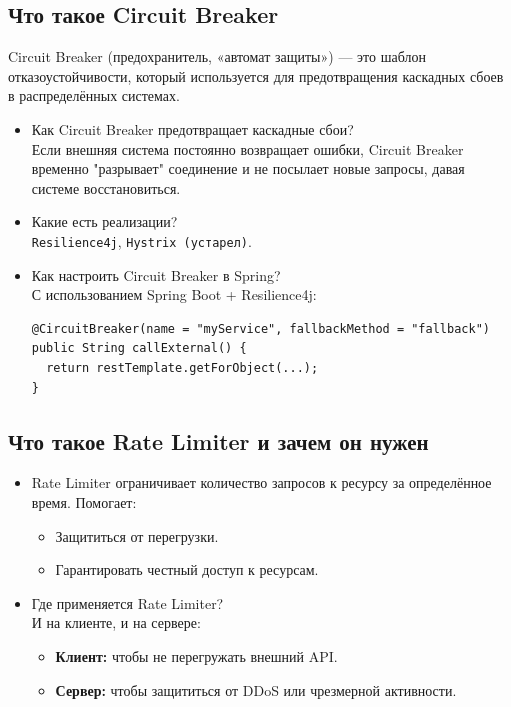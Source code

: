 \documentclass[a4paper,14pt]{article}
\begin{document}
\subsection{Что такое Circuit Breaker}
Circuit Breaker (предохранитель, «автомат защиты») — это шаблон отказоустойчивости, который используется для предотвращения каскадных сбоев в распределённых системах.
\begin{itemize}
\item Как Circuit Breaker предотвращает каскадные сбои? \\
Если внешняя система постоянно возвращает ошибки, Circuit Breaker временно "разрывает" соединение и не посылает новые запросы, давая системе восстановиться.

\item Какие есть реализации? \\
\texttt{Resilience4j}, \texttt{Hystrix (устарел)}.

\item Как настроить Circuit Breaker в Spring? \\
С использованием Spring Boot + Resilience4j:
\begin{lstlisting}[style=javastyle]
@CircuitBreaker(name = "myService", fallbackMethod = "fallback")
public String callExternal() {
  return restTemplate.getForObject(...);
}
\end{lstlisting}
\end{itemize}

\subsection{Что такое Rate Limiter и зачем он нужен}

\begin{itemize}
\item Rate Limiter ограничивает количество запросов к ресурсу за определённое время. Помогает:
\begin{itemize}
  \item Защититься от перегрузки.
  \item Гарантировать честный доступ к ресурсам.
\end{itemize}

\item Где применяется Rate Limiter? \\
И на клиенте, и на сервере:
\begin{itemize}
  \item \textbf{Клиент:} чтобы не перегружать внешний API.
  \item \textbf{Сервер:} чтобы защититься от DDoS или чрезмерной активности.
\end{itemize}
\end{itemize}
\end{document}
